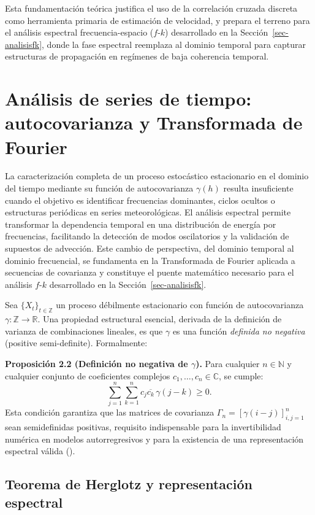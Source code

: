 \documentclass[
  spanish,
  us-letterpaper,
]{scrreprt}
\numberwithin{equation}{section}
\begin{document}
Esta fundamentación teórica justifica el uso de la correlación cruzada
discreta como herramienta primaria de estimación de velocidad, y prepara
el terreno para el análisis espectral frecuencia-espacio (\(f\)-\(k\))
desarrollado en la Sección~\ref{sec-analisisfk}, donde la fase espectral
reemplaza al dominio temporal para capturar estructuras de propagación
en regímenes de baja coherencia temporal.

\section{Análisis de series de tiempo: autocovarianza y Transformada de
Fourier}\label{sec-analisisseriestiempo}

La caracterización completa de un proceso estocástico estacionario en el
dominio del tiempo mediante su función de autocovarianza \(\gamma(h)\)
resulta insuficiente cuando el objetivo es identificar frecuencias
dominantes, ciclos ocultos o estructuras periódicas en series
meteorológicas. El análisis espectral permite transformar la dependencia
temporal en una distribución de energía por frecuencias, facilitando la
detección de modos oscilatorios y la validación de supuestos de
advección. Este cambio de perspectiva, del dominio temporal al dominio
frecuencial, se fundamenta en la Transformada de Fourier aplicada a
secuencias de covarianza y constituye el puente matemático necesario
para el análisis \(f\)-\(k\) desarrollado en la
Sección~\ref{sec-analisisfk}.

Sea \(\{X_t\}_{t \in \mathbb{Z}}\) un proceso débilmente estacionario
con función de autocovarianza \(\gamma: \mathbb{Z} \to \mathbb{R}\). Una
propiedad estructural esencial, derivada de la definición de varianza de
combinaciones lineales, es que \(\gamma\) es una función \emph{definida
no negativa} (positive semi-definite). Formalmente:

\textbf{Proposición 2.2 (Definición no negativa de \(\gamma\)).} Para
cualquier \(n \in \mathbb{N}\) y cualquier conjunto de coeficientes
complejos \(c_1, \dots, c_n \in \mathbb{C}\), se cumple: \[
\sum_{j=1}^n \sum_{k=1}^n c_j \overline{c_k} \, \gamma(j-k) \geq 0.
\] Esta condición garantiza que las matrices de covarianza
\(\Gamma_n = [\gamma(i-j)]_{i,j=1}^n\) sean semidefinidas positivas,
requisito indispensable para la invertibilidad numérica en modelos
autorregresivos y para la existencia de una representación espectral
válida ().

\subsection{Teorema de Herglotz y representación
espectral}\label{teorema-de-herglotz-y-representaciuxf3n-espectral}
\end{document}
